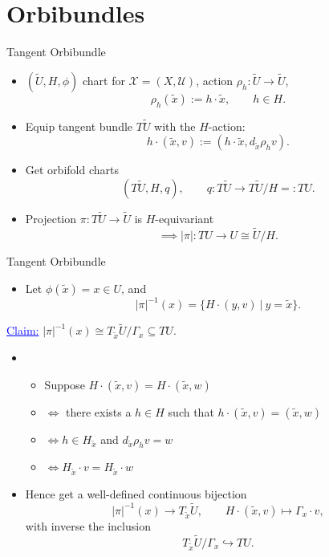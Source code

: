 \documentclass[aspectratio=169,xcolor=dvipsnames]{beamer}
\newcommand{\ra}{\rightarrow}
\begin{document}
\section{Orbibundles}

\begin{frame}{Tangent Orbibundle}
	\begin{itemize}
		\item $(\widetilde{U}, H, \phi)$ chart for $\mathcal{X} = (X, \mathcal{U})$, action $\rho_{h} : \widetilde{U} \ra \widetilde{U}$,
		\[
		\rho_{h}(\tilde{x}) := h \cdot \tilde{x}, \qquad h \in H.  
		\]
		\item Equip tangent bundle $T\widetilde{U}$ with the $H$-action:
		\[
		h \cdot (\tilde{x}, v) := \left( h \cdot \tilde{x}, d_{\tilde{x}}\rho_{h}v \right).
		\]
		\item Get orbifold charts
		\[
		\left(T\widetilde{U}, H, q\right), \qquad q : T\widetilde{U} \ra T\widetilde{U}/H =: TU.
		\]
		\item Projection $\pi : T\widetilde{U} \ra \widetilde{U}$ is $H$-equivariant
		\[
		\implies |\pi| : TU \ra U \cong \widetilde{U}/H.
		\]
	\end{itemize}
\end{frame}

\begin{frame}{Tangent Orbibundle}
	\begin{itemize}
		\item Let $\phi(\tilde{x}) = x \in U$, and 
		\[
		|\pi|^{-1}(x) = \{ H \cdot (y,v)\ |\ y = \tilde{x} \}.
		\]
	\end{itemize}
	\textcolor{blue}{\underline{Claim:}} $|\pi|^{-1}(x) \cong T_{\tilde{x}}\widetilde{U}/\Gamma_{x} \subseteq TU$.
	\begin{itemize}
		\item
		\begin{itemize}
			\item Suppose $H \cdot (\tilde{x},v) = H \cdot (\tilde{x}, w)$
			\item $\iff$ there exists a $h \in H$ such that $h \cdot (\tilde{x},v) = (\tilde{x},w)$
			\item $\iff h \in H_{\tilde{x}}$ and $d_{\tilde{x}}\rho_{h} v = w$
			\item $\iff H_{\tilde{x}} \cdot v = H_{\tilde{x}} \cdot w$
		\end{itemize}
		\item Hence get a well-defined continuous bijection
		\[
		|\pi|^{-1}(x) \rightarrow T_{\tilde{x}}\widetilde{U}, \qquad H \cdot (\tilde{x}, v) \mapsto \Gamma_{x} \cdot v,
		\]
		with inverse the inclusion
		\[
		T_{\tilde{x}}\widetilde{U}/\Gamma_{x} \hookrightarrow TU.    
		\]
	\end{itemize}
\end{frame}
\end{document}
